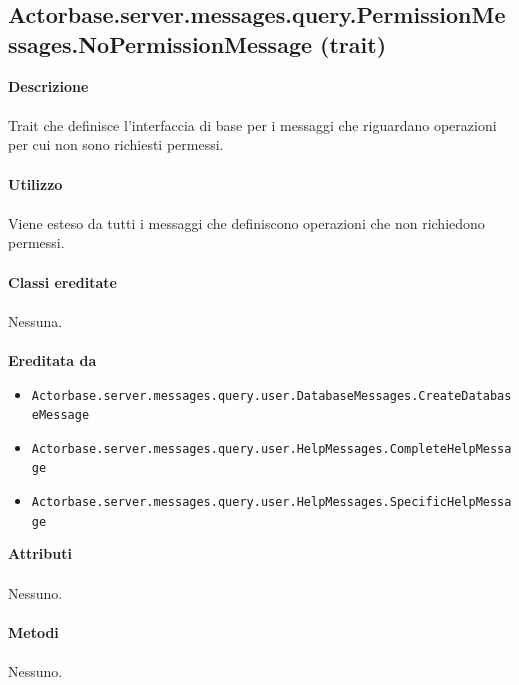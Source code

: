 \documentclass[a4paper]{article}
\begin{document}
\subsection{Actorbase.server.messages.query.PermissionMessages.NoPermissionMessage (trait)}
		\textbf{Descrizione}
			\\ \\
			Trait che definisce l'interfaccia di base per i messaggi che riguardano operazioni per cui non sono richiesti permessi.
			\\ \\
		\textbf{Utilizzo}
			\\ \\
			Viene esteso da tutti i messaggi che definiscono operazioni che non richiedono permessi.
			\\ \\
		\textbf{Classi ereditate}
			\\ \\
			Nessuna.
			\\ \\
		\textbf{Ereditata da}
			\begin{itemize}
				\item \texttt{Actorbase.server.messages.query.user.DatabaseMessages.CreateDatabaseMessage}
				\item \texttt{Actorbase.server.messages.query.user.HelpMessages.CompleteHelpMessage}
				\item \texttt{Actorbase.server.messages.query.user.HelpMessages.SpecificHelpMessage}
			\end{itemize}
		\textbf{Attributi}
			\\ \\
			Nessuno.
			\\ \\
		\textbf{Metodi}
			\\ \\
			Nessuno.
			
\end{document}
